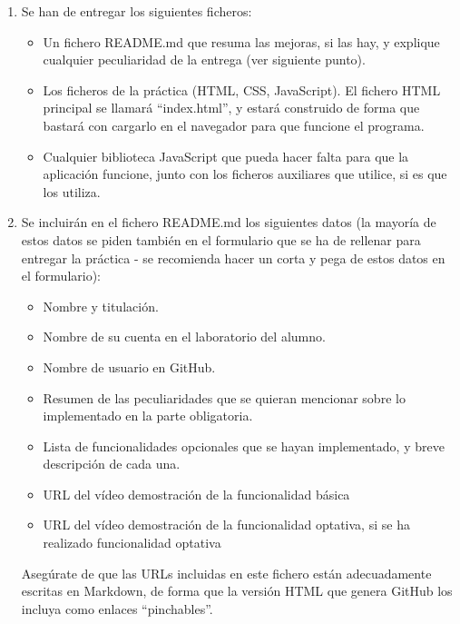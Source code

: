 \begin{enumerate}
  \item Se han de entregar los siguientes ficheros:

\begin{itemize}
  \item Un fichero README.md que resuma las mejoras, si las hay, y explique cualquier peculiaridad de la entrega (ver siguiente punto).
  \item Los ficheros de la práctica (HTML, CSS, JavaScript). El fichero HTML principal se llamará ``index.html'', y estará construido de forma que bastará con cargarlo en el navegador para que funcione el programa.
  \item Cualquier biblioteca JavaScript que pueda hacer falta para que la aplicación funcione, junto con los ficheros auxiliares que utilice, si es que los utiliza.
\end{itemize}

  \item Se incluirán en el fichero README.md los siguientes datos (la mayoría de estos datos se piden también en el formulario que se ha de rellenar para entregar la práctica - se recomienda hacer un corta y pega de estos datos en el formulario):

\begin{itemize}
  \item Nombre y titulación.
  \item Nombre de su cuenta en el laboratorio del alumno.
  \item Nombre de usuario en GitHub.
  \item Resumen de las peculiaridades que se quieran mencionar sobre lo implementado en la parte obligatoria.
  \item Lista de funcionalidades opcionales que se hayan implementado, y breve descripción de cada una.
  \item URL del vídeo demostración de la funcionalidad básica
  \item URL del vídeo demostración de la funcionalidad optativa, si se ha realizado funcionalidad optativa
\end{itemize}

Asegúrate de que las URLs incluidas en este fichero están adecuadamente escritas en Markdown, de forma que la versión HTML que genera GitHub los incluya como enlaces ``pinchables''.

\end{enumerate}

